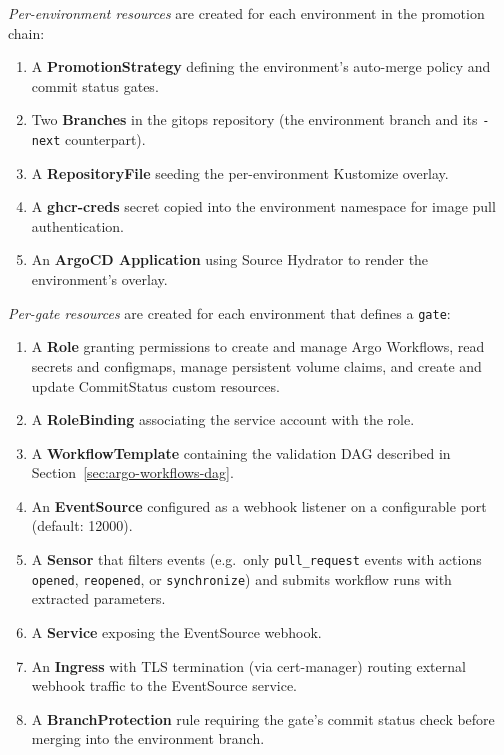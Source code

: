 \textit{Per-environment resources} are created for each environment in the promotion chain:

\begin{enumerate}
    \item A \textbf{PromotionStrategy} defining the environment's auto-merge policy and commit status gates.
    \item Two \textbf{Branches} in the gitops repository (the environment branch and its \texttt{-next} counterpart).
    \item A \textbf{RepositoryFile} seeding the per-environment Kustomize overlay.
    \item A \textbf{ghcr-creds} secret copied into the environment namespace for image pull authentication.
    \item An \textbf{ArgoCD Application} using Source Hydrator to render the environment's overlay.
\end{enumerate}

\textit{Per-gate resources} are created for each environment that defines a \texttt{gate}:

\begin{enumerate}
    \item A \textbf{Role} granting permissions to create and manage Argo Workflows, read secrets and configmaps, manage persistent volume claims, and create and update CommitStatus custom resources.
    \item A \textbf{RoleBinding} associating the service account with the role.
    \item A \textbf{WorkflowTemplate} containing the validation DAG described in Section~\ref{sec:argo-workflows-dag}.
    \item An \textbf{EventSource} configured as a webhook listener on a configurable port (default: 12000).
    \item A \textbf{Sensor} that filters events (e.g.\ only \texttt{pull\_request} events with actions \texttt{opened}, \texttt{reopened}, or \texttt{synchronize}) and submits workflow runs with extracted parameters.
    \item A \textbf{Service} exposing the EventSource webhook.
    \item An \textbf{Ingress} with TLS termination (via cert-manager) routing external webhook traffic to the EventSource service.
    \item A \textbf{BranchProtection} rule requiring the gate's commit status check before merging into the environment branch.
\end{enumerate}

